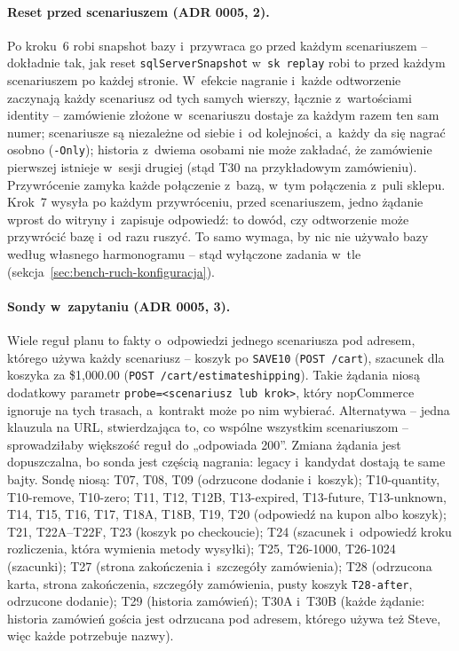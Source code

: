 \paragraph{Reset przed scenariuszem (ADR 0005, 2).} Po kroku~6
 robi snapshot bazy i~przywraca go przed każdym
scenariuszem -- dokładnie tak, jak reset \texttt{sqlServerSnapshot} w~\texttt{sk replay}
robi to przed każdym scenariuszem po każdej stronie. W~efekcie nagranie i~każde
odtworzenie zaczynają każdy scenariusz od tych samych wierszy, łącznie z~wartościami
identity -- zamówienie złożone w~scenariuszu dostaje za każdym razem ten sam numer;
scenariusze są niezależne od siebie i~od kolejności, a~każdy da się nagrać osobno
(\texttt{-Only}); historia z~dwiema osobami nie może zakładać, że zamówienie pierwszej
istnieje w~sesji drugiej (stąd T30 na przykładowym zamówieniu). Przywrócenie zamyka każde
połączenie z~bazą, w~tym połączenia z~puli sklepu. Krok~7 wysyła po każdym przywróceniu,
przed scenariuszem, jedno żądanie wprost do witryny i~zapisuje odpowiedź: to dowód, czy
odtworzenie może przywrócić bazę i~od razu ruszyć. To samo wymaga, by nic nie używało
bazy według własnego harmonogramu -- stąd wyłączone zadania w~tle
(sekcja~\ref{sec:bench-ruch-konfiguracja}).

\paragraph{Sondy w~zapytaniu (ADR 0005, 3).} Wiele reguł planu to fakty o~odpowiedzi
jednego scenariusza pod adresem, którego używa każdy scenariusz -- koszyk po
\texttt{SAVE10} (\texttt{POST /cart}), szacunek dla koszyka za \$1,000.00
(\texttt{POST /cart/estimateshipping}). Takie żądania niosą dodatkowy parametr
\texttt{probe=<scenariusz lub krok>}, który nopCommerce ignoruje na tych trasach,
a~kontrakt może po nim wybierać. Alternatywa -- jedna klauzula na URL, stwierdzająca to,
co wspólne wszystkim scenariuszom -- sprowadziłaby większość reguł do „odpowiada 200”.
Zmiana żądania jest dopuszczalna, bo sonda jest częścią nagrania: legacy i~kandydat
dostają te same bajty. Sondę niosą: T07, T08, T09 (odrzucone dodanie i~koszyk);
T10-quantity, T10-remove, T10-zero; T11, T12, T12B, T13-expired, T13-future,
T13-unknown, T14, T15, T16, T17, T18A, T18B, T19, T20 (odpowiedź na kupon albo koszyk);
T21, T22A--T22F, T23 (koszyk po checkoucie); T24 (szacunek i~odpowiedź kroku
rozliczenia, która wymienia metody wysyłki); T25, T26-1000, T26-1024 (szacunki); T27
(strona zakończenia i~szczegóły zamówienia); T28 (odrzucona karta, strona zakończenia,
szczegóły zamówienia, pusty koszyk \texttt{T28-after}, odrzucone dodanie); T29 (historia
zamówień); T30A i~T30B (każde żądanie: historia zamówień gościa jest odrzucana pod
adresem, którego używa też Steve, więc każde potrzebuje nazwy).

